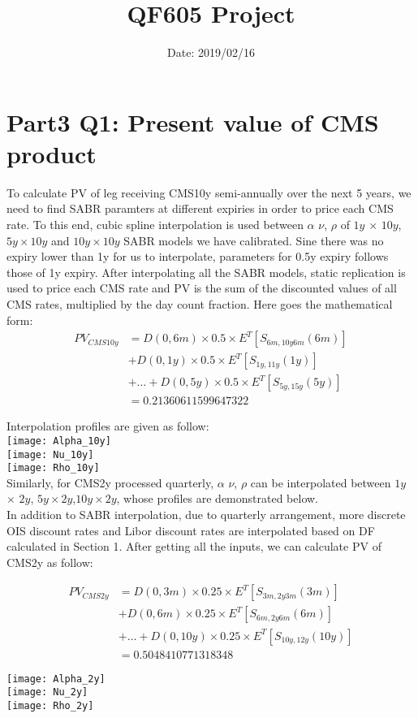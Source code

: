 \documentclass{article}
\title{\textbf{QF605 Project}}
\date{Date: 2019/02/16}
\begin{document}
	\maketitle

\section{Part3 Q1: Present value of CMS product}

\noindent To calculate PV of leg receiving CMS10y semi-annually over the next 5 years, we need to find SABR paramters at different expiries in order to price each CMS rate. To this end, cubic spline interpolation is used between $\alpha$ $\nu$, $\rho$ of $1y$ $\times$ $10y$, $5y\times10y$ and $10y\times10y$ SABR models we have calibrated. Sine there was no expiry lower than 1y for us to interpolate, parameters for 0.5y expiry follows those of 1y expiry. After interpolating all the SABR models, static replication is used to price each CMS rate and PV is the sum of the discounted values of all CMS rates, multiplied by the day count fraction. Here goes the mathematical form:
\begin{align*}
PV_{CMS10y}&=D(0,6m)\times 0.5 \times E^T [S_{6m,10y6m}(6m)] \\&+ D(0,1y) \times 0.5 \times E^T [S_{1y,11y}(1y)]\\&+ \dots 
+D(0,5y) \times 0.5 \times E^T [S_{5y,15y}(5y)]\\&= 0.21360611599647322
\end{align*}

Interpolation profiles are given as follow:\\
\texttt{[image: Alpha\_10y]}\\
\texttt{[image: Nu\_10y]}\\
\texttt{[image: Rho\_10y]}\\



\noindent Similarly, for CMS2y processed quarterly, $\alpha$ $\nu$, $\rho$ can be interpolated between $1y$ $\times$ $2y$, $5y\times2y$,$10y\times2y$, whose profiles are demonstrated below.\\ In addition to SABR interpolation, due to quarterly arrangement, more discrete OIS discount rates and Libor discount rates are interpolated based on DF calculated in Section 1. After getting all the inputs, we can calculate PV of CMS2y as follow:

\begin{align*}
PV_{CMS2y}&=D(0,3m)\times 0.25 \times E^T [S_{3m,2y3m}(3m)] \\&+ D(0,6m) \times 0.25 \times E^T [S_{6m,2y6m}(6m)]\\&+ \dots 
+D(0,10y) \times 0.25 \times E^T [S_{10y,12y}(10y)]\\&= 0.5048410771318348
\end{align*}

\texttt{[image: Alpha\_2y]}\\
\texttt{[image: Nu\_2y]}\\
\texttt{[image: Rho\_2y]}\\
\end{document}
